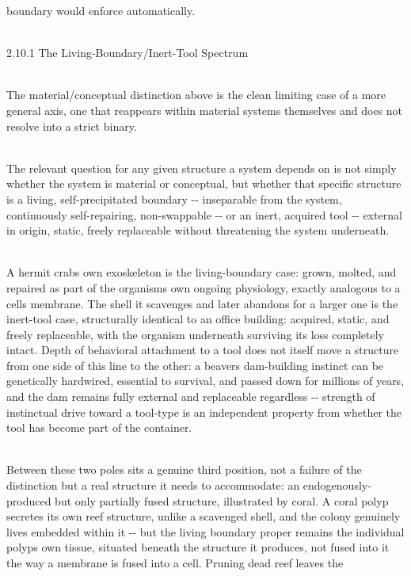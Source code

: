 \documentclass[
]{article}
\begin{document}
boundary would enforce automatically.\\
\strut \\
2.10.1 The Living-Boundary/Inert-Tool Spectrum\\
\strut \\
The material/conceptual distinction above is the clean limiting case of
a more general axis, one that reappears within material systems
themselves and does not resolve into a strict binary.\\
\strut \\
The relevant question for any given structure a system depends on is not
simply whether the system is material or conceptual, but whether that
specific structure is a living, self-precipitated boundary -\/-
inseparable from the system, continuously self-repairing, non-swappable
-\/- or an inert, acquired tool -\/- external in origin, static, freely
replaceable without threatening the system underneath.\\
\strut \\
A hermit crab\textquotesingle s own exoskeleton is the living-boundary
case: grown, molted, and repaired as part of the
organism\textquotesingle s own ongoing physiology, exactly analogous to
a cell\textquotesingle s membrane. The shell it scavenges and later
abandons for a larger one is the inert-tool case, structurally identical
to an office building: acquired, static, and freely replaceable, with
the organism underneath surviving its loss completely intact. Depth of
behavioral attachment to a tool does not itself move a structure from
one side of this line to the other: a beaver\textquotesingle s
dam-building instinct can be genetically hardwired, essential to
survival, and passed down for millions of years, and the dam remains
fully external and replaceable regardless -\/- strength of instinctual
drive toward a tool-type is an independent property from whether the
tool has become part of the container.\\
\strut \\
Between these two poles sits a genuine third position, not a failure of
the distinction but a real structure it needs to accommodate: an
endogenously-produced but only partially fused structure, illustrated by
coral. A coral polyp secretes its own reef structure, unlike a scavenged
shell, and the colony genuinely lives embedded within it -\/- but the
living boundary proper remains the individual polyp\textquotesingle s
own tissue, situated beneath the structure it produces, not fused into
it the way a membrane is fused into a cell. Pruning dead reef leaves the
\end{document}
